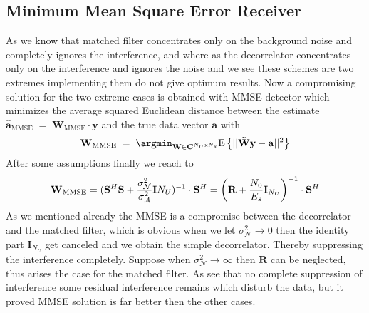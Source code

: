 \subsection{Minimum Mean Square Error Receiver}
As we know that matched filter concentrates only on the background noise and completely ignores the interference, and where as the decorrelator concentrates only on the interference and ignores the noise and we see these schemes are two extremes implementing them do not give optimum results. Now a compromising solution for the two extreme cases is obtained with MMSE detector which minimizes the average squared Euclidean distance between the estimate $\mathrm{\mathbf{\hat{a}}_{MMSE}}\;=\;\mathrm{\mathbf{W}_{MMSE}}\cdot\mathrm{\mathbf{y}}$ and the true data vector $\mathrm{\mathbf{a}}$ with 
\begin{equation*}
\mathrm{\mathbf{W}_{MMSE}}\;=\;\argmin_{\tilde{\mathrm{\mathbf{W}}}\in\mathrm{\mathbf{C}}^{N_U\mathrm{x}N_s}}\mathrm{E}\left\{\vert\vert\mathrm{\mathbf{\tilde{W}y}}-\mathrm{\mathbf{a}}\vert\vert^2\right\}
\end{equation*}
After some assumptions finally we reach to
\begin{equation}
\mathrm{\mathbf{W}_{MMSE}}=(\mathrm{\mathbf{S}}^H\mathrm{\mathbf{S}}+\frac{\hbox{$\sigma^2_{\mathcal{N}}$}}{\hbox{$\sigma^2_{\mathcal{A}}$}}\mathrm{\mathbf{I}}N_U)^{-1}\cdot\mathrm{\mathbf{S}}^{H}=\left(\mathrm{\mathbf{R}}+\frac{\hbox{$N_0$}}{\hbox{$E_s$}}\mathrm{\mathbf{I}}_{N_U}\right)^{-1}\cdot\mathrm{\mathbf{S}}^H
\end{equation}
As we mentioned already the MMSE is a compromise between the decorrelator and the matched filter, which is obvious when we let $\sigma^2_{\mathcal{N}}\rightarrow 0$ then the identity part $\mathrm{\mathbf{I}}_{N_U}$ get canceled and we obtain the simple decorrelator. Thereby suppressing the interference completely. Suppose when  $\sigma^2_{\mathcal{N}}\rightarrow \infty$ then $\mathrm{\mathbf{R}}$ can be neglected, thus arises the case for the matched filter. As see that no complete suppression of interference some residual interference remains which disturb the data, but it proved MMSE solution is far better then the other cases.
